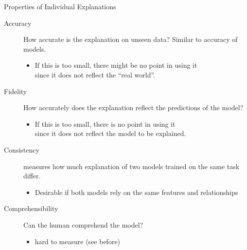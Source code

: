 \documentclass[aspectratio=169]{../latex_main/tntbeamer}  %
\begin{document}
\begin{frame}[c]{Properties of Individual Explanations~}
	
	\begin{description}
        \item[Accuracy] How accurate is the explanation on unseen data? Similar to accuracy of models.
        \begin{itemize}
            \item If this is too small, there might be no point in using it\\ since it does not reflect the ``real world''.
        \end{itemize}
        \medskip
        \pause
        \item[Fidelity] How accurately does the explanation reflect the predictions of the model? 
        \begin{itemize}
            \item If this is too small, there is no point in using it\\ since it does not reflect the model to be explained.
        \end{itemize}
        \medskip
        \pause
        \item[Consistency] measures how much explanation of two models trained on the same task differ. 
        \begin{itemize}
            \item Desirable if both models rely on the same features and relationships
        \end{itemize}
        \medskip
        \pause
        \item[Comprehensibility] Can the human comprehend the model?
        \begin{itemize}
            \item hard to measure (see before)
        \end{itemize}
	\end{description}
\end{frame}
\end{document}
